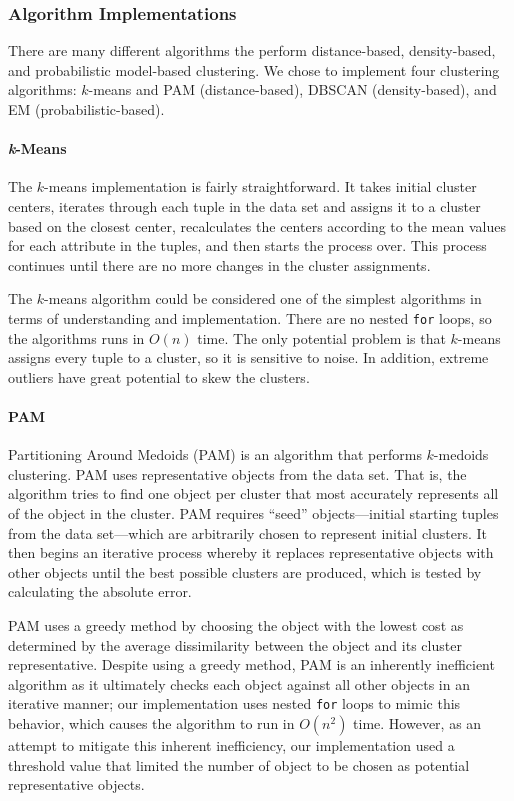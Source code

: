 \documentclass[11pt,letterpaper]{article}
\begin{document}
\subsubsection{Algorithm Implementations}
There are many different algorithms the perform distance-based, density-based, and probabilistic model-based clustering.  We chose to implement four clustering algorithms:  $k$-means and PAM (distance-based), DBSCAN (density-based), and EM (probabilistic-based).

\paragraph{\textit{k}-Means} The $k$-means implementation is fairly straightforward.  It takes initial cluster centers, iterates through each tuple in the data set and assigns it to a cluster based on the closest center, recalculates the centers according to the mean values for each attribute in the tuples, and then starts the process over.  This process continues until there are no more changes in the cluster assignments.

The $k$-means algorithm could be considered one of the simplest algorithms in terms of understanding and implementation.  There are no nested \verb+for+ loops, so the algorithms runs in $O(n)$ time.  The only potential problem is that $k$-means assigns every tuple to a cluster, so it is sensitive to noise.  In addition, extreme outliers have great potential to skew the clusters.

\paragraph{PAM} Partitioning Around Medoids (PAM) is an algorithm that performs $k$-medoids clustering.  PAM uses representative objects from the data set.  That is, the algorithm tries to find one object per cluster that most accurately represents all of the object in the cluster.  PAM requires ``seed'' objects---initial starting tuples from the data set---which are arbitrarily chosen to represent initial clusters.  It then begins an iterative process whereby it replaces representative objects with other objects until the best possible clusters are produced, which is tested by calculating the absolute error.

PAM uses a greedy method by choosing the object with the lowest cost as determined by the average dissimilarity between the object and its cluster representative.  Despite using a greedy method, PAM is an inherently inefficient algorithm as it ultimately checks each object against all other objects in an iterative manner; our implementation uses nested \verb+for+ loops to mimic this behavior, which causes the algorithm to run in $O(n^{2})$ time.  However, as an attempt to mitigate this inherent inefficiency, our implementation used a threshold value that limited the number of object to be chosen as potential representative objects.
\end{document}
